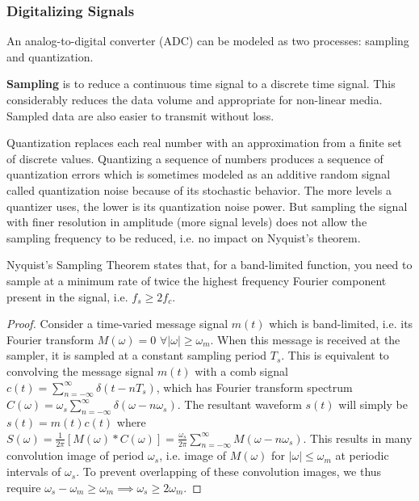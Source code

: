 \documentclass[a4paper]{article}
\begin{document}
\subsubsection*{Digitalizing Signals~\cite{squires_2001,dunlap1988experimental}}
An analog-to-digital converter (ADC) can be modeled as two processes: sampling and quantization.
\begin{Note}[Sampling]
\textbf{Sampling} is to reduce a continuous time signal to a discrete time signal. This considerably reduces the data volume and appropriate for non-linear media. Sampled data are also easier to transmit without loss.
\end{Note}
\begin{Note}[Quantization]
Quantization replaces each real number with an approximation from a finite set of discrete values. Quantizing a sequence of numbers produces a sequence of quantization errors which is sometimes modeled as an additive random signal called quantization noise because of its stochastic behavior. The more levels a quantizer uses, the lower is its quantization noise power. But sampling the signal with finer resolution in amplitude (more signal levels) does not allow the sampling frequency to be reduced, i.e. no impact on Nyquist's theorem.
\end{Note}
\begin{thm}
Nyquist's Sampling Theorem states that, for a band-limited function, you need to sample at a minimum rate of twice the highest frequency Fourier component present in the signal, i.e. $f_s\geq 2f_c$.
\end{thm}
\begin{proof}
Consider a time-varied message signal $m(t)$ which is band-limited, i.e. its Fourier transform $M(\omega)=0$ $\forall|\omega|\geq\omega_m$. When this message is received at the sampler, it is sampled at a constant sampling period $T_s$. This is equivalent to convolving the message signal $m(t)$ with a comb signal $c(t)=\sum_{n=-\infty}^\infty\delta(t-nT_s)$, which has Fourier transform spectrum $C(\omega)=\omega_s\sum_{n=-\infty}^{\infty}\delta(\omega-n\omega_s)$. The resultant waveform $s(t)$ will simply be $s(t)=m(t)c(t)$ where $S(\omega)=\frac{1}{2\pi}[M(\omega)*C(\omega)]=\frac{\omega_s}{2\pi}\sum_{n=-\infty}^\infty M(\omega-n\omega_s)$. This results in many convolution image of period $\omega_s$, i.e. image of $M(\omega)$ for $|\omega|\leq\omega_m$ at periodic intervals of $\omega_s$. To prevent overlapping of these convolution images, we thus require $\omega_s-\omega_m\geq\omega_m\implies\omega_s\geq 2\omega_m$.
\end{proof}
\end{document}
